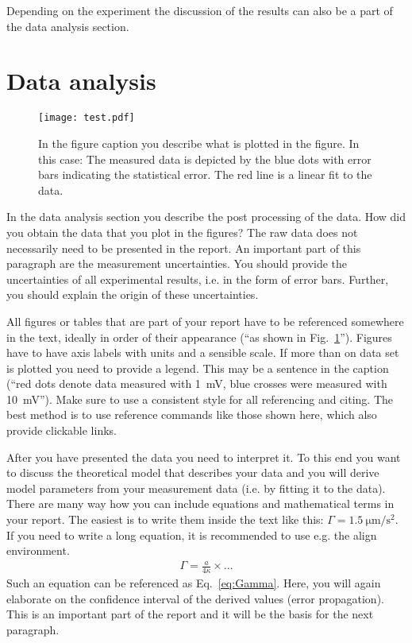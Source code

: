 \documentclass[12pt,a4paper]{article}
\begin{document}
Depending on the experiment the discussion of the results can
also be a part of the data analysis section.

\section{Data analysis}

\begin{figure}
\centering
\texttt{[image: test.pdf]}
\caption{In the figure caption you describe what is plotted in the
figure. In this case: The measured data is depicted by the blue dots
with error bars indicating the statistical error. The red line is a
linear fit to the data.} \label{fig1}
\end{figure}

In the data analysis section you describe the post processing of the
data. How did you obtain the data that you plot in the figures? The raw data does not necessarily need
to be presented in the report. An important part of this paragraph
are the measurement uncertainties. You should provide the
uncertainties of all experimental results, i.e. in the form of error
bars. Further, you should explain the origin of these uncertainties.

All figures or tables that are part of your report have to be
referenced somewhere in the text, ideally in order of their
appearance (``as shown in Fig.~\ref{fig1}''). Figures have to
have axis labels with units and a sensible scale. If more than on
data set is plotted you need to provide a legend. This may be a sentence in the caption (``red dots denote data measured with \SI{1}{\milli\volt}, blue crosses were measured with \SI{10}{\milli\volt}''). Make sure to use a consistent style for all referencing and citing. The best method is to use reference commands like those shown here, which also provide clickable links.

After you have presented the data you need to interpret it. To this
end you want to discuss the theoretical model that describes your
data and you will derive model parameters from your measurement data
(i.e. by fitting it to the data). There are many way how you can include equations and mathematical terms in your report. The easiest is to write them inside the text like this: $\Gamma =\SI{1.5}{\micro\meter\per\square\second}$. If you need to write a long equation, it is recommended to use e.g. the align environment.
\begin{align}\label{eq:Gamma}
    \Gamma = \frac{a}{4\kappa}\times ...
\end{align}
Such an equation can be referenced as Eq.~\eqref{eq:Gamma}. Here, you will again elaborate on
the confidence interval of the derived values (error propagation).
This is an important part of the report and it will be the basis for
the next paragraph.
\end{document}
